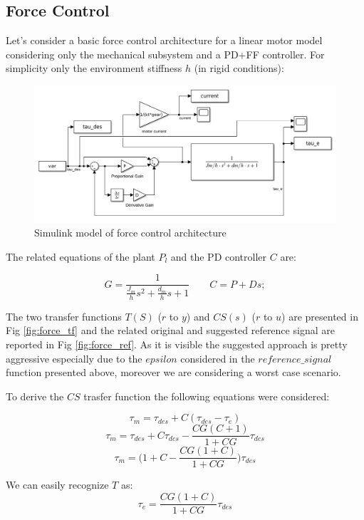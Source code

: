 \documentclass[a4paper,11pt]{article}
\begin{document}
\newpage
\subsection{Force Control}
Let's consider a basic force control architecture for a linear motor model considering only the mechanical subsystem and a PD+FF controller. For simplicity only the environment stiffness $h$ (in rigid conditions):

\begin{figure}[H]
\begin{center}
\includegraphics[width=1\textwidth]{images/force.png}
\end{center}
\caption{Simulink model of force control architecture}
\label{fig:force_control}
\end{figure}

\noindent The related equations of the plant $P_l$ and the PD controller $C$ are:

\[
G = \frac{1}{\frac{J_m}{h}s^2 + \frac{d_m}{h}s + 1} \qquad
C = P + Ds;                             
\]

\bigskip
\noindent The two transfer functions $T(S)$ ($r$ to $y$) and $CS(s)$ ($r$ to $u$) are presented in Fig \ref{fig:force_tf} and the related original and suggested reference signal are reported in Fig \ref{fig:force_ref}. As it is visible the suggested approach is pretty aggressive especially due to the $epsilon$ considered in the $reference\_signal$ function presented above, moreover we are considering a worst case scenario.

\bigskip
\noindent To derive the $CS$ trasfer function the following equations were considered:

\[
  \tau_m = \tau_{des} + C(\tau_{des} - \tau_e)
\]
\[
  \tau_m = \tau_{des} + C\tau_{des} - \frac{CG(C+1)}{1+CG}\tau_{des}
\]
\[
  \tau_m = \bigg(1 + C - \frac{CG(1+C)}{1+CG}\bigg)\tau_{des}
\]

We can easily recognize $T$ as:
\[
  \tau_e = \frac{CG(1+C)}{1+CG}\tau_{des}
\]
\end{document}
